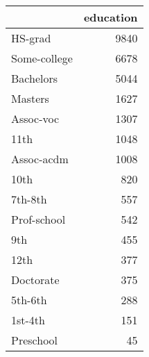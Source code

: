 \begin{tabular}{lr}
\toprule
{} &  education \\
\midrule
 HS-grad      &       9840 \\
 Some-college &       6678 \\
 Bachelors    &       5044 \\
 Masters      &       1627 \\
 Assoc-voc    &       1307 \\
 11th         &       1048 \\
 Assoc-acdm   &       1008 \\
 10th         &        820 \\
 7th-8th      &        557 \\
 Prof-school  &        542 \\
 9th          &        455 \\
 12th         &        377 \\
 Doctorate    &        375 \\
 5th-6th      &        288 \\
 1st-4th      &        151 \\
 Preschool    &         45 \\
\bottomrule
\end{tabular}
